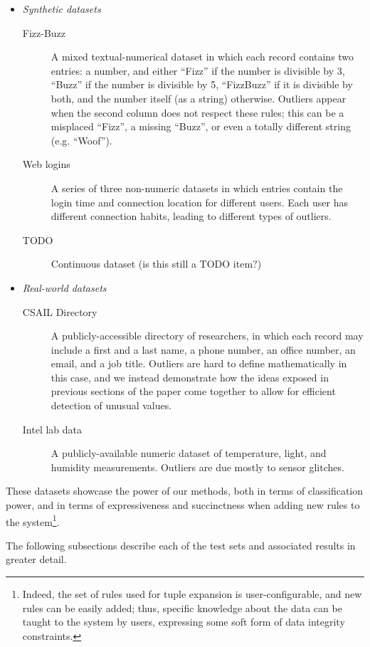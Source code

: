 \begin{itemize}
\item \emph{Synthetic datasets}
  \begin{description}
  \item[Fizz-Buzz] A mixed textual-numerical dataset in which each record contains two entries: a number, and either ``Fizz'' if the number is divisible by 3, ``Buzz'' if the number is divisible by 5, ``FizzBuzz'' if it is divisible by both, and the number itself (as a string) otherwise. Outliers appear when the second column does not respect these rules; this can be a misplaced ``Fizz'', a missing ``Buzz'', or even a totally different string (e.g. ``Woof'').
  \item[Web logins] A series of three non-numeric datasets in which entries contain the login time and connection location for different users. Each user has different connection habits, leading to different types of outliers.
  \item[TODO] Continuous dataset (is this still a TODO item?)
  \end{description}
\item \emph{Real-world datasets}
  \begin{description}
  \item[CSAIL Directory] A publicly-accessible directory of researchers, in which each record may include a first and a last name, a phone number, an office number, an email, and a job title. Outliers are hard to define mathematically in this case, and we instead demonstrate how the ideas exposed in previous sections of the paper come together to allow for efficient detection of unusual values.
  \item[Intel lab data] A publicly-available numeric dataset of temperature, light, and humidity measurements. Outliers are due mostly to sensor glitches.
  \end{description}
\end{itemize}

These datasets showcase the power of our methods, both in terms of classification power, and in terms of expressiveness and succinctness when adding new rules to the system\footnote{Indeed, the set of rules used for tuple expansion is user-configurable, and new rules can be easily added; thus, specific knowledge about the data can be taught to the system by users, expressing some soft form of data integrity constraints.}.

The following subsections describe each of the test sets and associated results in greater detail.





%
%
